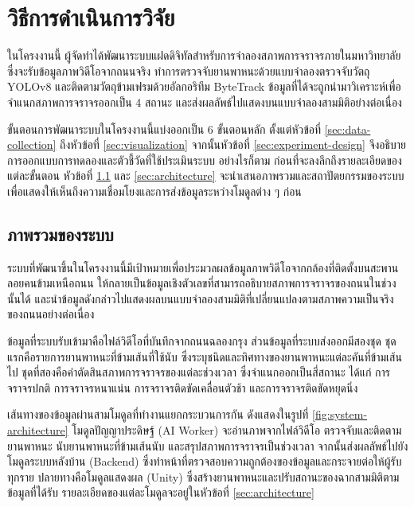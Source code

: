 \chapter{วิธีการดำเนินการวิจัย}
\label{chapter:experiment}

ในโครงงานนี้ ผู้จัดทำได้พัฒนาระบบแฝดดิจิทัลสำหรับการจำลองสภาพการจราจรภายในมหาวิทยาลัย ซึ่งจะรับข้อมูลภาพวิดีโอจากถนนจริง ทำการตรวจจับยานพาหนะด้วยแบบจำลองตรวจจับวัตถุ YOLOv8 และติดตามวัตถุข้ามเฟรมด้วยอัลกอริทึม ByteTrack ข้อมูลที่ได้จะถูกนำมาวิเคราะห์เพื่อจำแนกสภาพการจราจรออกเป็น 4 สถานะ และส่งผลลัพธ์ไปแสดงบนแบบจำลองสามมิติอย่างต่อเนื่อง

ขั้นตอนการพัฒนาระบบในโครงงานนี้แบ่งออกเป็น 6 ขั้นตอนหลัก ตั้งแต่หัวข้อที่ \ref{sec:data-collection} ถึงหัวข้อที่ \ref{sec:visualization} จากนั้นหัวข้อที่ \ref{sec:experiment-design} จึงอธิบายการออกแบบการทดลองและตัวชี้วัดที่ใช้ประเมินระบบ อย่างไรก็ตาม ก่อนที่จะลงลึกถึงรายละเอียดของแต่ละขั้นตอน หัวข้อที่ \ref{sec:system-overview} และ \ref{sec:architecture} จะนำเสนอภาพรวมและสถาปัตยกรรมของระบบ เพื่อแสดงให้เห็นถึงความเชื่อมโยงและการส่งข้อมูลระหว่างโมดูลต่าง ๆ ก่อน

\section{ภาพรวมของระบบ}
\label{sec:system-overview}

ระบบที่พัฒนาขึ้นในโครงงานนี้มีเป้าหมายเพื่อประมวลผลข้อมูลภาพวิดีโอจากกล้องที่ติดตั้งบนสะพานลอยคนข้ามเหนือถนน ให้กลายเป็นข้อมูลเชิงตัวเลขที่สามารถอธิบายสภาพการจราจรของถนนในช่วงนั้นได้ และนำข้อมูลดังกล่าวไปแสดงผลบนแบบจำลองสามมิติที่เปลี่ยนแปลงตามสภาพความเป็นจริงของถนนอย่างต่อเนื่อง

ข้อมูลที่ระบบรับเข้ามาคือไฟล์วิดีโอที่บันทึกจากถนนฉลองกรุง ส่วนข้อมูลที่ระบบส่งออกมีสองชุด ชุดแรกคือรายการยานพาหนะที่ข้ามเส้นที่ใช้นับ ซึ่งระบุชนิดและทิศทางของยานพาหนะแต่ละคันที่ข้ามเส้นไป ชุดที่สองคือคำตัดสินสภาพการจราจรของแต่ละช่วงเวลา ซึ่งจำแนกออกเป็นสี่สถานะ ได้แก่ การจราจรปกติ การจราจรหนาแน่น การจราจรติดขัดเคลื่อนตัวช้า และการจราจรติดขัดหยุดนิ่ง

เส้นทางของข้อมูลผ่านสามโมดูลที่ทำงานแยกกระบวนการกัน ดังแสดงในรูปที่ \ref{fig:system-architecture} โมดูลปัญญาประดิษฐ์ (AI Worker) จะอ่านภาพจากไฟล์วิดีโอ ตรวจจับและติดตามยานพาหนะ นับยานพาหนะที่ข้ามเส้นนับ และสรุปสภาพการจราจรเป็นช่วงเวลา จากนั้นส่งผลลัพธ์ไปยังโมดูลระบบหลังบ้าน (Backend) ซึ่งทำหน้าที่ตรวจสอบความถูกต้องของข้อมูลและกระจายต่อให้ผู้รับทุกราย ปลายทางคือโมดูลแสดงผล (Unity) ซึ่งสร้างยานพาหนะและปรับสถานะของฉากสามมิติตามข้อมูลที่ได้รับ รายละเอียดของแต่ละโมดูลจะอยู่ในหัวข้อที่ \ref{sec:architecture}

